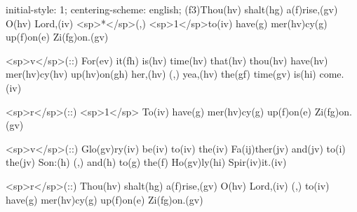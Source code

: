initial-style: 1;
centering-scheme: english;
(f3)Thou(hv) shalt(hg) a(f)rise,(gv) O(hv) Lord,(iv) <sp>*</sp>(,) <sp>1</sp>to(iv) have(g) mer(hv)cy(g) up(f)on(e) Zi(fg)on.(gv) 

<sp>v</sp>(::) For(ev) it(fh) is(hv) time(hv) that(hv) thou(hv) have(hv) mer(hv)cy(hv) up(hv)on(gh) her,(hv) (,) yea,(hv) the(gf) time(gv) is(hi) come.(iv) 

<sp>r</sp>(::) <sp>1</sp> To(iv) have(g) mer(hv)cy(g) up(f)on(e) Zi(fg)on.(gv)

<sp>v</sp>(::) Glo(gv)ry(iv) be(iv) to(iv) the(iv) Fa(ij)ther(jv) and(jv) to(i) the(jv) Son:(h) (,) and(h) to(g) the(f) Ho(gv)ly(hi) Spir(iv)it.(iv)

<sp>r</sp>(::) Thou(hv) shalt(hg) a(f)rise,(gv) O(hv) Lord,(iv) (,) to(iv) have(g) mer(hv)cy(g) up(f)on(e) Zi(fg)on.(gv)